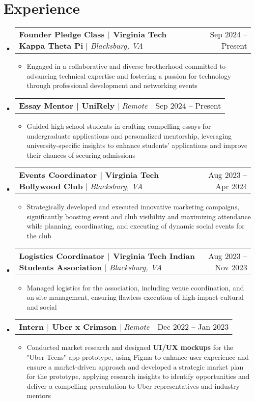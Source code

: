 \documentclass[a4paper,11pt]{article}
\makeatletter
\newcommand{\resumeItem}[1]{
  \item\small{
    {#1 \vspace{-2pt}}
  }
}
\newcommand{\resumeProjectHeading}[2]{
    \item
    \begin{tabular*}{0.97\textwidth}{l@{\extracolsep{\fill}}r}
      \small#1 & #2 \\
    \end{tabular*}\vspace{-7pt}
}
\newcommand{\resumeSubHeadingListStart}{\begin{itemize}[leftmargin=0.15in, label={}]}
\newcommand{\resumeSubHeadingListEnd}{\end{itemize}}
\newcommand{\resumeItemListStart}{\begin{itemize}}
\newcommand{\resumeItemListEnd}{\end{itemize}\vspace{-5pt}}
\makeatother
\begin{document}
\section{Experience}
  \resumeSubHeadingListStart
      \resumeProjectHeading
        {\textbf{Founder Pledge Class | Virginia Tech Kappa Theta Pi} $|$ \emph{Blacksburg, VA}} {Sep 2024 -- Present}
        \resumeItemListStart
         \resumeItem{Engaged in a collaborative and diverse brotherhood committed to advancing technical expertise and fostering a passion for technology through professional development and networking events}
        \resumeItemListEnd
      \resumeProjectHeading
        {\textbf{Essay Mentor | UniRely} $|$ \emph{Remote}} {Sep 2024 -- Present}
        \resumeItemListStart
         \resumeItem{Guided high school students in crafting compelling essays for undergraduate applications and personalized mentorship, leveraging university-specific insights to enhance students' applications and improve their chances of securing admissions}
        \resumeItemListEnd
      \resumeProjectHeading
        {\textbf{Events Coordinator | Virginia Tech Bollywood Club} $|$ \emph{Blacksburg, VA}} {Aug 2023 -- Apr 2024}
        \resumeItemListStart
         \resumeItem{Strategically developed and executed innovative marketing campaigns, significantly boosting event and club visibility and maximizing attendance while planning, coordinating, and executing of dynamic social events for the club}
        \resumeItemListEnd
      \resumeProjectHeading
        {\textbf{Logistics Coordinator | Virginia Tech Indian Students Association} $|$ \emph{Blacksburg, VA}} {Aug 2023 -- Nov 2023}
        \resumeItemListStart
         \resumeItem{Managed logistics for the association, including venue coordination, and on-site management, ensuring flawless execution of high-impact cultural and social}
        \resumeItemListEnd
      \resumeProjectHeading
        {\textbf{Intern | Uber x Crimson} $|$ \emph{Remote}} {Dec 2022 -- Jan 2023}
        \resumeItemListStart
         \resumeItem{Conducted market research and designed \textbf{UI/UX mockups} for the "Uber-Teens" app prototype, using Figma to enhance user experience and ensure a market-driven approach and developed a strategic market plan for the prototype, applying research insights to identify opportunities and deliver a compelling presentation to Uber representatives and industry mentors   }
        \resumeItemListEnd
  \resumeSubHeadingListEnd

\end{document}
